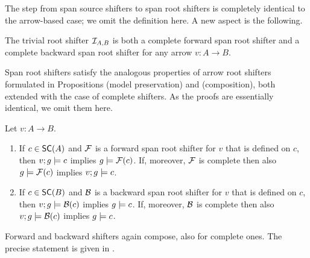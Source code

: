 \medskip\noindent
The step from span source shifters to span root shifters is completely identical to the arrow-based case; we omit the definition here. A new aspect is the following.

\begin{proposition}
The trivial root shifter $\mathcal{I}_{A,B}$ is both a complete forward span root shifter and a complete backward span root shifter for any arrow $v:A\to B$. 
\end{proposition}
%
Span root shifters satisfy the analogous properties of arrow root shifters formulated in Propositions  (model preservation) and  (composition), both extended with the case of complete shifters. 
\iffull
As the proofs are essentially identical, we omit them here. 
\fi

\begin{proposition}
Let $v:A\to B$.
\begin{enumerate}[topsep=\smallskipamount]
\item If $c\in \SC A$ and $\mathcal{F}$ is a forward span root shifter for $v$ that is defined on $c$, then $v;g\models c$ implies $g\models \mathcal{F}(c)$. If, moreover, $\mathcal{F}$ is complete then also $g\models \mathcal{F}(c)$ implies $v;g\models c$.
\item If $c\in \SC B$ and $\mathcal{B}$ is a backward span root shifter for $v$ that is defined on $c$, then $v;g\models \mathcal{B}(c)$ implies $g\models c$. If, moreover, $\mathcal{B}$ is complete then also $v;g\models \mathcal{B}(c)$ implies $g\models c$.
\end{enumerate}
\end{proposition}
%
Forward and backward shifters again compose, also for complete ones.
\iffest
The precise statement is given in .
\fi

